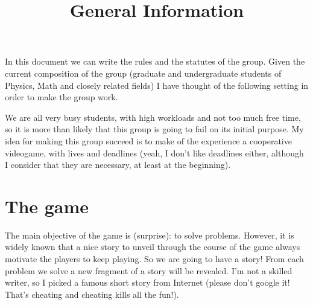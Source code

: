 \documentclass[english,11pt]{article}
\theoremstyle{definition}
\theoremstyle{plain}
\begin{document}
\title{General Information}
\maketitle
In this document we can write the rules and the statutes of the group. Given the current composition of the group (graduate and undergraduate students of Physics, Math and closely related fields) I have thought of the following setting in order to make the group work.
\par We are all very busy students, with high workloads and not too much free time, so it is more than likely that this group is going to fail on its initial purpose. My idea for making this group succeed is to make of the experience a cooperative videogame, with lives and deadlines (yeah, I don't like deadlines either, although I consider that they are necessary, at least at the beginning). 

\section*{The game}
The main objective of the game is (surprise): to solve problems. However, it is widely known that a nice story to unveil through the course of the game always motivate the players to keep playing. So we are going to have a story! From each problem we solve a new fragment of a story will be revealed. I'm not a skilled writer, so I picked a famous short story from Internet (please don't google it! That's cheating and cheating kills all the fun!).
\end{document}

